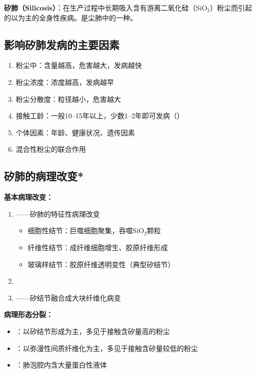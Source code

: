 \begin{defbox}
\textbf{矽肺（Silicosis）}：在生产过程中长期吸入含有游离二氧化硅（SiO$_2$）粉尘而引起的以为主的全身性疾病。是尘肺中的一种。
\end{defbox}

\subsection{影响矽肺发病的主要因素}

\begin{enumerate}[leftmargin=*]
    \item 粉尘中：含量越高，危害越大，发病越快
    \item 粉尘浓度：浓度越高，发病越早
    \item 粉尘分散度：粒径越小，危害越大
    \item 接触工龄：一般10--15年以上，少数1--2年即可发病（）
    \item 个体因素：年龄、健康状况、遗传因素
    \item 混合性粉尘的联合作用
\end{enumerate}

\subsection{矽肺的病理改变*}

\begin{keybox}
\textbf{基本病理改变：}
\begin{enumerate}[leftmargin=*]
    \item {}——矽肺的特征性病理改变
    \begin{itemize}
        \item 细胞性结节：巨噬细胞聚集，吞噬SiO$_2$颗粒
        \item 纤维性结节：成纤维细胞增生、胶原纤维形成
        \item 玻璃样结节：胶原纤维透明变性（典型矽结节）
    \end{itemize}
    \item {}
    \item {}——矽结节融合成大块纤维化病变
\end{enumerate}

\textbf{病理形态分裂：}
\begin{itemize}[leftmargin=*]
    \item {}：以矽结节形成为主，多见于接触含矽量高的粉尘
    \item {}：以弥漫性间质纤维化为主，多见于接触含矽量较低的粉尘
    \item {}：肺泡腔内含大量蛋白性液体
\end{itemize}
\end{keybox}

